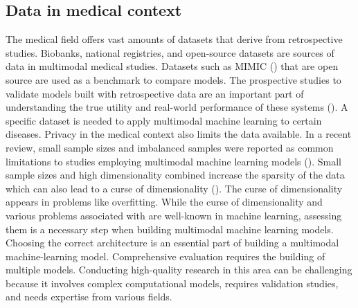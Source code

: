 \subsection{Data in medical context}

The medical field offers vast amounts of datasets that derive from retrospective studies. Biobanks, national registries, and open-source datasets are sources of data in multimodal medical studies. Datasets such as MIMIC (\cite{articlemimic4}) that are open source are used as a benchmark to compare models. The prospective studies to validate models built with retrospective data are an important part of understanding the true utility and real-world performance of these systems (\cite{kelly2019key}). A specific dataset is needed to apply multimodal machine learning to certain diseases. Privacy in the medical context also limits the data available. In a recent review, small sample sizes and imbalanced samples were reported as common limitations to studies employing multimodal machine learning models (\cite{articlePreciRev}). Small sample sizes and high dimensionality combined increase the sparsity of the data which can also lead to a curse of dimensionality (\cite{articlecurse}). The curse of dimensionality appears in problems like overfitting. While the curse of dimensionality and various problems associated with are well-known in machine learning, assessing them is a necessary step when building multimodal machine learning models. Choosing the correct architecture is an essential part of building a multimodal machine-learning model. Comprehensive evaluation requires the building of multiple models. Conducting high-quality research in this area can be challenging because it involves complex computational models, requires validation studies, and needs expertise from various fields.
